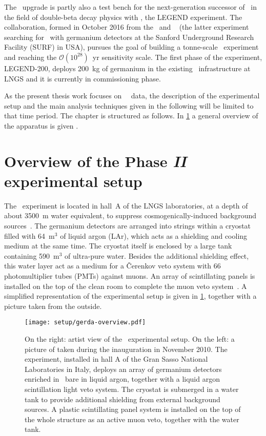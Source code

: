 The \phasetwop\ upgrade is partly also a test bench for the next-generation successor of
\gerda\ in the field of double-beta decay physics with \gesix, the LEGEND experiment. The
collaboration, formed in October 2016 from the \gerda\ and \majorana~\cite{Abgrall2014}
(the latter experiment searching for \onbb\ with germanium detectors at the Sanford
Underground Research Facility (SURF) in USA), pursues the goal of building a tonne-scale
\gesix\ experiment and reaching the $\mathcal{O}(10^{28})$~yr sensitivity scale. The first
phase of the experiment, LEGEND-200, deploys 200~kg of germanium in the existing \gerda\
infrastructure at LNGS and it is currently in commissioning phase.

As the present thesis work focuses on \gerda\ \phasetwo\ data, the description of the
experimental setup and the main analysis techniques given in the following will be limited
to that time period. The chapter is structured as follows. In \cref{sec:gerda:setup} a
general overview of the apparatus is given \fillme{expand}.

\section{Overview of the Phase {\normalfont\textit{II}} experimental setup}%
\label{sec:gerda:setup}

The \gerda\ experiment is located in hall~A of the LNGS laboratories, at a depth of about
3500~m water equivalent, to suppress cosmogenically-induced background
sources~\cite{Wiesinger2018}. The germanium detectors are arranged into strings within a
cryostat filled with 64~m$^3$ of liquid argon (LAr), which acts as a shielding and cooling
medium at the same time. The cryostat itself is enclosed by a large tank containing
590~m$^3$ of ultra-pure water.  Besides the additional shielding effect, this water layer
act as a medium for a \v{C}erenkov veto system with 66 photomultiplier tubes (PMTs)
against muons. An array of scintillating panels is installed on the top of the clean room
to complete the muon veto system~\cite{Freund2016}. A simplified representation of the
experimental setup is given in \cref{fig:setup:overview}, together with a picture taken
from the outside.

\begin{figure}
  \centering
  \texttt{[image: setup/gerda-overview.pdf]}
  \caption{%
    On the right: artist view of the \gerda\ experimental setup. On the left: a picture of
    taken during the inauguration in November 2010. The experiment, installed in hall A of
    the Gran Sasso National Laboratories in Italy, deploys an array of germanium detectors
    enriched in \gesix\ bare in liquid argon, together with a liquid argon scintillation
    light veto system. The cryostat is submerged in a water tank to provide additional
    shielding from external background sources. A plastic scintillating panel system is
    installed on the top of the whole structure as an active muon veto, together with the
    water tank.
  }\label{fig:setup:overview}
\end{figure}

